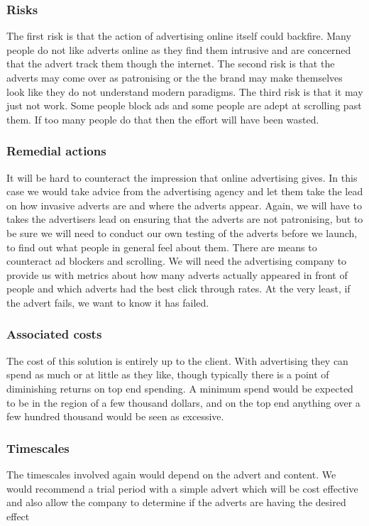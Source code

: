 \documentclass{article}
\begin{document}
\subsubsection{Risks}
The first risk is that the action of advertising online itself could backfire. Many people do not like adverts online as they find them intrusive and are concerned that the advert track them though the internet.
The second risk is that the adverts may come over as patronising or the the brand may make themselves look like they do not understand modern paradigms. 
The third risk is that it may just not work. Some people block ads and some people are adept at scrolling past them. If too many people do that then the effort will have been wasted.
\subsubsection{Remedial actions}
It will be hard to counteract the impression that online advertising gives. In this case we would take advice from the advertising agency and let them take the lead on how invasive adverts are and where the adverts appear.
Again, we will have to takes the advertisers lead on ensuring that the adverts are not patronising, but to be sure we will need to conduct our own testing of the adverts before we launch, to find out what people in general feel about them.
There are means to counteract ad blockers and scrolling. We will need the advertising company to provide us with metrics about how many adverts actually appeared in front of people and which adverts had the best click through rates. At the very least, if the advert fails, we want to know it has failed.

\subsubsection{Associated costs}
The cost of this solution is entirely up to the client. With advertising they can spend as much or at little as they like, though typically there is a point of diminishing returns on top end spending.
A minimum spend would be expected to be in the region of a few thousand dollars, and on the top end anything over a few hundred thousand would be seen as excessive.

\subsubsection{Timescales}
The timescales involved again would depend on the advert and content. We would recommend a trial period with a simple advert which will be cost effective and also allow the company to determine if the adverts are having the desired effect
\end{document}
